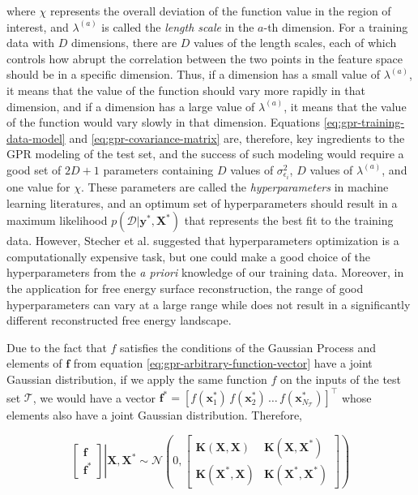 \begin{spacing}{2.0}
    \noindent where $\chi$ represents the overall deviation of the function value in the region of interest, and $\lambda^{(a)}$ is called the 
    \textsl{length scale} in the $a$-th dimension. For a training data with $D$ dimensions, there are $D$ values of the length scales, each of 
    which controls how abrupt the correlation between the two points in the feature space should be in a specific dimension. Thus, if a dimension 
    has a small value of $\lambda^{(a)}$, it means that the value of the function should vary more rapidly in that dimension, and if a dimension 
    has a large value of $\lambda^{(a)}$, it means that the value of the function would vary slowly in that dimension. Equations
    \ref{eq:gpr-training-data-model} and \ref{eq:gpr-covariance-matrix} are, therefore, key ingredients to the GPR modeling of the test set, and 
    the success of such modeling would require a good set of $2D+1$ parameters containing $D$ values of $\sigma_{\epsilon_i}^2$, $D$ values
    of $\lambda^{(a)}$, and one value for $\chi$. These parameters are called the \textsl{hyperparameters} in machine learning literatures,
    and an optimum set of hyperparameters should result in a maximum likelihood $p(\mathcal{D}|\mathbf{y}^*,\mathbf{X}^*)$ that represents the best 
    fit to the training data. However, Stecher et al. suggested that hyperparameters optimization is a computationally expensive task, but one could 
    make a good choice of the hyperparameters from the \textsl{a priori} knowledge of our training data. Moreover, in the application for free energy surface 
    reconstruction, the range of good hyperparameters can vary at a large range while does not result in a significantly different reconstructed 
    free energy landscape. \cite{P-JCTC-2014-v10-Stecher}

    Due to the fact that $f$ satisfies the conditions of the Gaussian Process and elements of $\mathbf{f}$ from equation \ref{eq:gpr-arbitrary-function-vector}
    have a joint Gaussian distribution, if we apply the same function $f$ on the inputs of the test set $\mathcal{T}$, we would have a vector
    $\mathbf{f}^* = \left[f(\mathbf{x}_1^*)\,f(\mathbf{x}_2^*)\,\ldots\,f(\mathbf{x}_{N_{\mathcal{T}}}^*)\right]^{\top}$ whose elements also have a 
    joint Gaussian distribution. Therefore, \cite{B-GaussianProcessML-Rasmussen}

    \begin{equation}
        \left.\begin{bmatrix}
            \mathbf{f} \\ \mathbf{f}^*
        \end{bmatrix}\right|\mathbf{X},\mathbf{X}^* \sim \mathcal{N}\left(0,
            \begin{bmatrix}
                \mathbf{K}(\mathbf{X},\mathbf{X}) & \mathbf{K}(\mathbf{X},\mathbf{X}^*) \\
                \mathbf{K}(\mathbf{X}^*,\mathbf{X}) & \mathbf{K}(\mathbf{X}^*,\mathbf{X}^*)
            \end{bmatrix}
        \right)
        \label{eq:gpr-distribution-gaussian-process}
    \end{equation}


\end{spacing}
